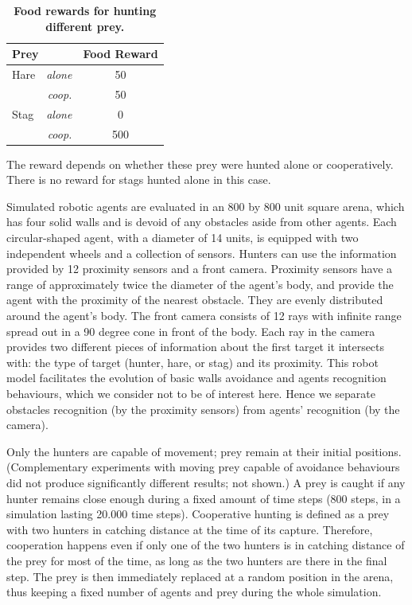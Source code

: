       \begin{table}[ht]
        \centering
          \caption{\textbf{Food rewards for hunting different prey.}}
          \begin{tabular}{|l|r|c|}
            \hline
            \multicolumn{2}{|l|}{\textbf{Prey}} & \textbf{Food Reward} \\
            \hline
            Hare & \textit{alone} & 50 \\
            \hline
            & \textit{coop.} & 50 \\
            \hline
            Stag & \textit{alone} & 0 \\
            \hline
            & \textit{coop.} & 500 \\
            \hline
          \end{tabular}
          \begin{flushleft} The reward depends on whether these prey were hunted alone or cooperatively. There is no reward for stags hunted alone in this case.
          \end{flushleft}
        \label{table:tableRewardsInitial}
      \end{table}

      Simulated robotic agents are evaluated in an 800 by 800 unit square arena, which has four solid walls and is devoid of any obstacles aside from other agents. Each circular-shaped agent, with a diameter of 14 units, is equipped with two independent wheels and a collection of sensors. Hunters can use the information provided by 12 proximity sensors and a front camera. Proximity sensors have a range of approximately twice the diameter of the agent's body, and provide the agent with the proximity of the nearest obstacle. They are evenly distributed around the agent's body. The front camera consists of 12 rays with infinite range spread out in a 90 degree cone in front of the body. Each ray in the camera provides two different pieces of information about the first target it intersects with: the type of target (hunter, hare, or stag) and its proximity. This robot model facilitates the evolution of basic walls avoidance and agents recognition behaviours, which we consider not to be of interest here. Hence we separate obstacles recognition (by the proximity sensors) from agents' recognition (by the camera).

      Only the hunters are capable of movement; prey remain at their initial positions. (Complementary experiments with moving prey capable of avoidance behaviours did not produce significantly different results; not shown.) A prey is caught if any hunter remains close enough during a fixed amount of time steps (800 steps, in a simulation lasting 20.000 time steps). Cooperative hunting is defined as a prey with two hunters in catching distance at the time of its capture. Therefore, cooperation happens even if only one of the two hunters is in catching distance of the prey for most of the time, as long as the two hunters are there in the final step. The prey is then immediately replaced at a random position in the arena, thus keeping a fixed number of agents and prey during the whole simulation.


